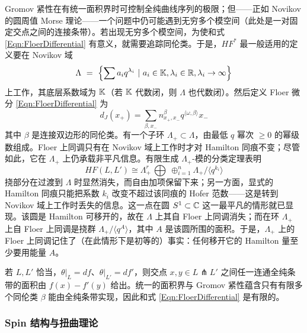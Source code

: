 Gromov 紧性在有统一面积界时可控制全纯曲线序列的极限；但——正如 Novikov 的圆周值 Morse 理论——一个问题中仍可能遇到无穷多个模空间（此处是一对固定交点之间的连接条带）。若出现无穷多个模空间，为使和式 \eqref{Eqn:FloerDifferential} 有意义，就需要追踪同伦类。于是，$HF^*$ 最一般适用的定义要在 Novikov 域
\begin{equation} \label{Eqn:NovikovField}
\Lambda \ = \ \left\{ \sum a_i q^{\lambda_i} \ | \ a_i \in \mathbb{K}, \lambda_i \in \mathbb{R}, \lambda_i \rightarrow \infty \right\}
\end{equation}
上工作，其底层系数域为 $\mathbb{K}$（若 $\mathbb{K}$ 代数闭，则 $\Lambda$ 也代数闭）。然后定义 Floer 微分 \eqref{Eqn:FloerDifferential} 为
\begin{equation} \label{Eqn:FloerDifferential-Novikov}
d_J(x_+) = \sum_{\beta, x_-} n^{\beta}_{x_+, x_-} q^{\langle \omega, \beta\rangle} x_-
\end{equation}
其中 $\beta$ 是连接双边形的同伦类。有一个子环 $\Lambda_+ \subset \Lambda$，由最低 $q$ 幂次 $\geq 0$ 的幂级数组成。Floer 上同调只有在 Novikov 域上工作时才对 Hamilton 同痕不变；尽管如此，它在 $\Lambda_+$ 上仍承载非平凡信息。有限生成 $\Lambda_+$-模的分类定理表明
\[
HF(L,L') \cong \Lambda_+^r \, \bigoplus \ \oplus_{i=1}^n \Lambda_+ / \langle q^{k_i} \rangle
\]
挠部分在过渡到 $\Lambda$ 时显然消失，而自由加项保留下来；另一方面，显式的 Hamilton 同痕只能把系数 $k_i$ 改变不超过该同痕的 Hofer 范数——这是转到 Novikov 域上工作时丢失的信息。这一点在圆 $S^1 \subset \mathbb{C}$ 这一最平凡的情形就已显现。该圆是 Hamilton 可移开的，故在 $\Lambda$ 上其自 Floer 上同调消失；而在环 $\Lambda_+$ 上自 Floer 上同调是挠群 $\Lambda_+ / \langle q^A \rangle$，其中 $A$ 是该圆所围的面积。于是，$\Lambda_+$ 上的 Floer 上同调记住了（在此情形下是初等的）事实：任何移开它的 Hamilton 量至少要用能量 $A$。

\begin{Example}
若 $L, L'$ 恰当，$\theta|_L = df$、$\theta|_{L'} = df'$，则交点 $x,y \in L\pitchfork L'$ 之间任一连通全纯条带的面积由 $f(x)-f'(y)$ 给出。统一的面积界与 Gromov 紧性蕴含只有有限多个同伦类 $\beta$ 能由全纯条带实现，因此和式 \eqref{Eqn:FloerDifferential} 是有限的。
\end{Example}

\subsubsection{Spin 结构与扭曲理论}

